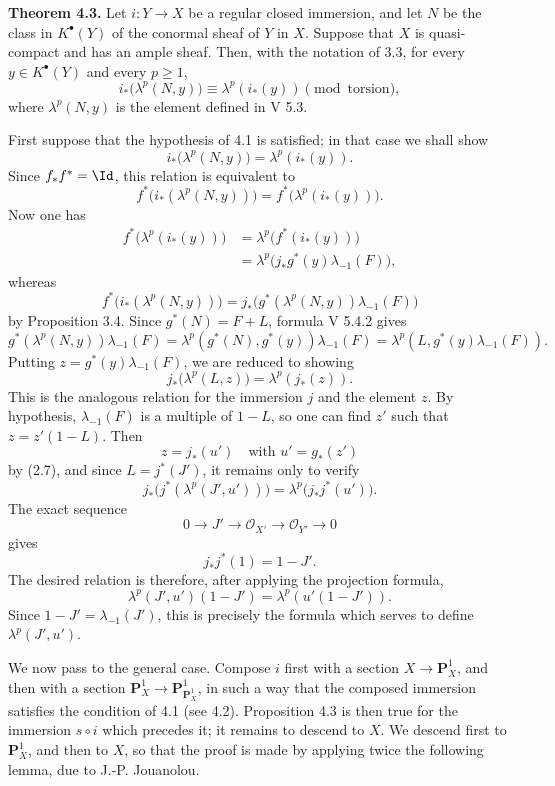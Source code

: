 \textbf{Theorem 4.3.} Let \(i:Y\to X\) be a regular closed immersion, and let \(N\) be the class in \(K^\bullet(Y)\) of the conormal sheaf of \(Y\) in \(X\). Suppose that \(X\) is quasi-compact and has an ample sheaf. Then, with the notation of 3.3, for every \(y\in K^\bullet(Y)\) and every \(p\ge1\),
\begin{equation}\tag{4.3.1}
 i_*\bigl(\lambda^p(N,y)\bigr)\equiv \lambda^p(i_*(y))
 \pmod{\text{torsion}},
\end{equation}
where \(\lambda^p(N,y)\) is the element defined in V 5.3.

First suppose that the hypothesis of 4.1 is satisfied; in that case we shall show
\[
  i_*\bigl(\lambda^p(N,y)\bigr)=\lambda^p(i_*(y)).
\]
Since \(f_*f^*=\Id\), this relation is equivalent to
\[
  f^*\bigl(i_*(\lambda^p(N,y))\bigr)=
  f^*\bigl(\lambda^p(i_*(y))\bigr).
\]
Now one has
\[
\begin{aligned}
 f^*\bigl(\lambda^p(i_*(y))\bigr)
 &=\lambda^p\bigl(f^*(i_*(y))\bigr)\\
 &=\lambda^p\bigl(j_*g^*(y)\lambda_{-1}(F)\bigr),
\end{aligned}
\tag{3.4}
\]
whereas
\[
  f^*\bigl(i_*(\lambda^p(N,y))\bigr)
  =
  j_*\bigl(g^*(\lambda^p(N,y))\lambda_{-1}(F)\bigr)
  \tag{3.4}
\]
by Proposition 3.4. Since \(g^*(N)=F+L\), formula V 5.4.2 gives
\[
  g^*(\lambda^p(N,y))\lambda_{-1}(F)
  =
  \lambda^p(g^*(N),g^*(y))\lambda_{-1}(F)
  =
  \lambda^p(L,g^*(y)\lambda_{-1}(F)).
\]
Putting \(z=g^*(y)\lambda_{-1}(F)\), we are reduced to showing
\[
  j_*\bigl(\lambda^p(L,z)\bigr)=\lambda^p(j_*(z)).
\]
This is the analogous relation for the immersion \(j\) and the element \(z\). By hypothesis, \(\lambda_{-1}(F)\) is a multiple of \(1-L\), so one can find \(z'\) such that \(z=z'(1-L)\). Then
\[
  z=j_*(u')\quad\text{with }u'=g_*(z')
\]
by (2.7), and since \(L=j^*(J')\), it remains only to verify
\[
  j_*\bigl(j^*(\lambda^p(J',u'))\bigr)=
  \lambda^p\bigl(j_*j^*(u')\bigr).
\]
The exact sequence
\[
  0\longrightarrow J'\longrightarrow \mathcal O_{X'}
  \longrightarrow \mathcal O_{Y'}\longrightarrow 0
\]
gives
\begin{equation}\tag{4.3.2}
  j_*j^*(1)=1-J'.
\end{equation}
The desired relation is therefore, after applying the projection formula,
\[
  \lambda^p(J',u')(1-J')=\lambda^p(u'(1-J')).
\]
Since \(1-J'=\lambda_{-1}(J')\), this is precisely the formula which serves to define \(\lambda^p(J',u')\).

We now pass to the general case. Compose \(i\) first with a section \(X\to\mathbf P_X^1\), and then with a section \(\mathbf P_X^1\to\mathbf P_{\mathbf P_X^1}^1\), in such a way that the composed immersion satisfies the condition of 4.1 (see 4.2). Proposition 4.3 is then true for the immersion \(s\circ i\) which precedes it; it remains to descend to \(X\). We descend first to \(\mathbf P_X^1\), and then to \(X\), so that the proof is made by applying twice the following lemma, due to J.-P. Jouanolou.

